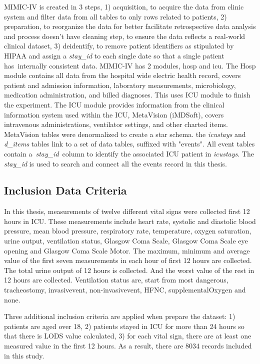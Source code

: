 \documentclass[12pt,a4paper,english
]{tunithesis}
\begin{document}
MIMIC-IV is created in 3 steps, 1) acquisition, to acquire the data from clinic system and filter data from all tables to only rows related to patients, 2) preparation, to reorganize the data for better facilitate retrospective data analysis and process doesn't have cleaning step, to ensure the data reflects a real-world clinical dataset, 3) deidentify, to remove patient identifiers as stipulated by HIPAA and assign a \textit{stay\_id} to each single date so that a single patient has internally consistent data. MIMIC-IV has 2 modules, hosp and icu. The Hosp module contains all data from the hospital wide electric health record, covers patient and admission information, laboratory measurements, microbiology, medication administration, and billed diagnoses. This uses ICU module to finish the experiment. The ICU module provides information from the clinical information system used within the ICU, MetaVision (iMDSoft), covers intravenous administrations, ventilator settings, and other charted items. MetaVision tables were denormalized to create a star schema. the \textit{icustays} and \textit{d\_items} tables link to a set of data tables,  suffixed with "events". All event tables contain a \textit{stay\_id} column to identify the associated ICU patient in \textit{icustays}. The \textit{stay\_id} is used to search and connect all the events record in this thesis. \parencite{johnson2023}

\subsection{Inclusion Data Criteria}
In this thesis, measurements of  twelve different vital signs were collected first 12 hours in ICU. These measurements include heart rate, systolic and diastolic blood pressure, mean blood pressure, respiratory rate, temperature, oxygen saturation, urine output, ventilation status, Glasgow Coma Scale, Glasgow Coma Scale eye opening and Glasgow Coma Scale Motor. The maximum, minimum and average value of the first seven measurements in each hour of first 12 hours are collected. The total urine output of 12 hours is collected. And the worst value of the rest in 12 hours are collected. Ventilation status are, start from most dangerous, tracheostomy, invasivevent, non-invasivevent, HFNC, supplementalOxygen and none.

Three additional inclusion criteria are applied when prepare the dataset: 1) patients are aged over 18, 2) patients stayed in ICU for more than 24 hours so that there is LODS value calculated, 3) for each vital sign, there are at least one measured value in the first 12 hours. As a result, there are 8034 records included in this study.
\end{document}
